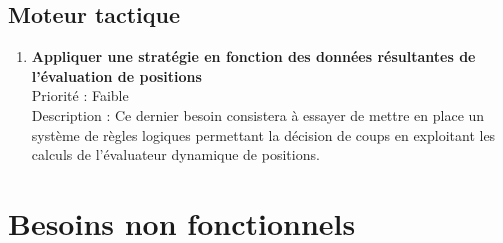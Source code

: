		\subsection{Moteur tactique}

			\begin{enumerate}

				\item \textbf{Appliquer une stratégie en fonction des données résultantes de l'évaluation de positions} 
				\\[0.7\baselineskip]
				Priorité : Faible 
				\\[0.7\baselineskip]
				Description : Ce dernier besoin consistera à essayer de mettre en place un système de règles logiques permettant la décision de coups en exploitant les 
				calculs de l'évaluateur dynamique de positions. 
				
			\end{enumerate}
	

	\section{Besoins non fonctionnels}

